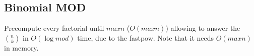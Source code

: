 \subsection{Binomial MOD}

Precompute every factorial until $maxn$ ($O(maxn)$) allowing to answer the $\binom{n}{k}$ in $O(\log{mod})$ time, due to the fastpow. Note that it needs $O(maxn)$ in memory.
